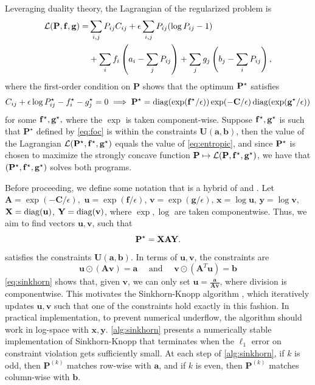 \documentclass{article}
\renewcommand{\b}{\mathbf}
\theoremstyle{definition}
\theoremstyle{remark}
\newcommand{\feasible}{\b U(\b a, \b b)}
\begin{document}
Leveraging duality theory, the Lagrangian of the regularized problem is 
\begin{align*}
\mathcal L(\b P, \b f, \b g) = & \sum_{i,j} P_{ij}C_{ij} + \epsilon \sum_
{i,j} P_{ij}
(\log
 P_{ij} - 1) \\ 
& + \sum_i f_i\pr{a_i - \sum_{j}P_{ij}} + \sum_j g_j \pr{b_j - \sum_i P_{ij}},
\end{align*}
where the first-order condition on $\b P$ shows that the optimum $\b P^\*$
 satisfies 
\begin{equation}
\label{eq:foc}
  C_{ij} + \epsilon \log P_{ij}^\* - f_i^\star - g_j^\* = 0 \implies \b P^\* =
 \diag(\exp(\b f^\* / \epsilon)) \exp(-\b C/\epsilon )\diag(\exp(\b g^\* /
 \epsilon))
\end{equation}
for some $\b f^\star, \b g^\*,$ where the $\exp$ is taken component-wise.
 Suppose $\b f^\star, \b g^\*$ is such that $\b P^\star$ defined by 
\eqref{eq:foc} is within the constraints $\feasible$, then the value of the
 Lagrangian $\mathcal L(\b P^\*, \b f^\*, \b g^\*)$ equals the value of 
\eqref{eq:entropic}, and since  $\b P^\*$ is chosen to maximize the strongly
 concave function $\b P \mapsto \mathcal L(\b P, \b f^\*, \b g^\*)$, we have
 that $(\b P^\*, \b f^\*, \b g^\*)$ solves both programs. 

Before proceeding, we define some notation that is a hybrid of 
\cite{peyre2017computational} and \cite{altschuler2017near}. Let $\b A = \exp
(-\b C / \epsilon),$ $\b u = \exp(\b f / \epsilon)$, $\b v = \exp(\b g /
 \epsilon)$, $\b x = \log \b u$, $\b y = \log \b v$, $\b X = \diag(\b u)$, $\b
 Y = \diag(\b v)$, where $\exp, \log$ are taken componentwise. Thus, we aim to
 find vectors $\b u, \b v$, such that \[
\b P^\* = \b X \b A \b Y.
\]
satisfies the constraints $\feasible.$ In terms of $\b u, \b v$, the constraints
 are \begin{equation}
\label{eq:sinkhorn}
   \b u \odot (\b A \b v) = \b a \quad \text{    and    } \quad \b v \odot (\b A^T
 \b u) = \b b 
 \end{equation}
\eqref{eq:sinkhorn} shows that, given $\b v$, we can only set $\b u = \frac{\b
 a }{\b A \b v}$, where division is componentwise. This motivates the
 Sinkhorn-Knopp algorithm \cite{sinkhorn1967concerning}, which iteratively
 updates
 $\b u, \b v$ such that one of the constraints hold exactly in this fashion. In
 practical implementation, to prevent numerical underflow, the algorithm should
 work in log-space with $\b x, \b y$. \cref{alg:sinkhorn} presents a numerically
 stable implementation of Sinkhorn-Knopp that terminates when the $\ell_1$ error
 on constraint violation gets sufficiently small. At each step of 
\cref{alg:sinkhorn}, if $k$ is odd, then $\b P^{(k)}$ matches row-wise with $\b
 a$, and if $k$ is even, then $\b P^{(k)}$ matches column-wise with $\b
 b$.
\end{document}
